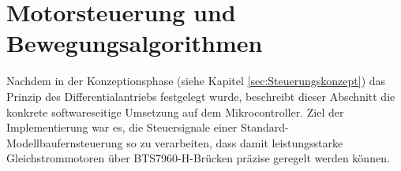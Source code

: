 
%
%
%
%	

%

\section{Motorsteuerung und Bewegungsalgorithmen}
\label{cha:Motorsteuerung und Bewegungsalgorithmen}

Nachdem in der Konzeptionsphase (siehe Kapitel \ref{sec:Steuerungskonzept}) das Prinzip des Differentialantriebs festgelegt wurde, beschreibt dieser Abschnitt die konkrete softwareseitige Umsetzung auf dem Mikrocontroller. Ziel der Implementierung war es, die Steuersignale einer Standard-Modellbaufernsteuerung so zu verarbeiten, dass damit leistungsstarke Gleichstrommotoren über BTS7960-H-Brücken präzise geregelt werden können.

